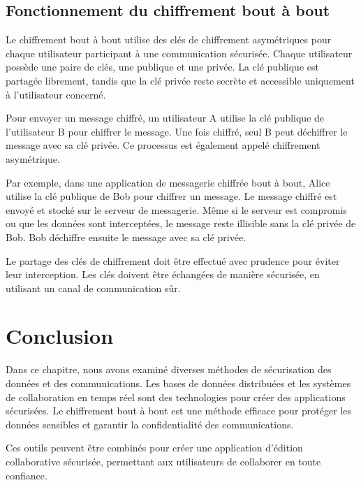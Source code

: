 \subsection{Fonctionnement du chiffrement bout à bout}
Le chiffrement bout à bout utilise des clés de chiffrement asymétriques pour chaque utilisateur participant à une communication sécurisée. Chaque utilisateur possède une paire de clés, une publique et une privée. La clé publique est partagée librement, tandis que la clé privée reste secrète et accessible uniquement à l'utilisateur concerné.

Pour envoyer un message chiffré, un utilisateur A utilise la clé publique de l'utilisateur B pour chiffrer le message. Une fois chiffré, seul B peut déchiffrer le message avec sa clé privée. Ce processus est également appelé chiffrement asymétrique.

Par exemple, dans une application de messagerie chiffrée bout à bout, Alice utilise la clé publique de Bob pour chiffrer un message. Le message chiffré est envoyé et stocké sur le serveur de messagerie. Même si le serveur est compromis ou que les données sont interceptées, le message reste illisible sans la clé privée de Bob. Bob déchiffre ensuite le message avec sa clé privée.

Le partage des clés de chiffrement doit être effectué avec prudence pour éviter leur interception. Les clés doivent être échangées de manière sécurisée, en utilisant un canal de communication sûr.

\section{Conclusion}

Dans ce chapitre, nous avons examiné diverses méthodes de sécurisation des données et des communications. Les bases de données distribuées et les systèmes de collaboration en temps réel sont des technologies pour créer des applications sécurisées. Le chiffrement bout à bout est une méthode efficace pour protéger les données sensibles et garantir la confidentialité des communications.

Ces outils peuvent être combinés pour créer une application d'édition collaborative sécurisée, permettant aux utilisateurs de collaborer en toute confiance.
